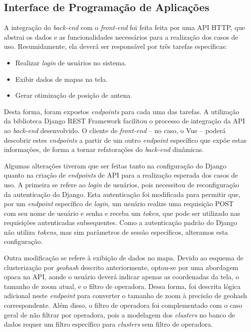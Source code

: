 \documentclass[]{politex}
\begin{document}
\subsection{Interface de Programação de Aplicações}

A integração do \textit{back-end} com o \textit{front-end} foi feita feita por uma API HTTP, que
abstrai os dados e as funcionalidades necessários para a realização dos casos de
uso. Resumidamente, ela deverá ser responsável por três tarefas específicas:

\begin{itemize}
\item Realizar \textit{login} de usuários no sistema.
\item Exibir dados de mapas na tela.
\item Gerar otimização de posição de antena.
\end{itemize}

Desta forma, foram expostos \textit{endpoints} para cada uma das tarefas. A utilização
da biblioteca Django REST Framework facilitou o processo de integração da API
ao \textit{back-end} desenvolvido. O cliente de \textit{front-end} -- no caso, o Vue -- poderá descobrir
estes \textit{endpoints} a partir de um outro \textit{endpoint} específico que expõe estas informações,
de forma a tornar refatorações do \textit{back-end} dinâmicas.

Algumas alterações tiveram que ser feitas tanto na configuração do Django quanto
na criação de \textit{endpoints} de API para a realização esperada dos casos de uso. A primeira
se refere ao \textit{login} de usuários, pois necessitou de reconfiguração da
autenticação do Django. Esta autenticação foi modificada para permitir que, por
um \textit{endpoint} específico de \textit{login}, um usuário realize uma requisição POST com seu
nome de usuário e senha e receba um \textit{token}, que pode ser utilizado nas requisições
autenticadas subsequentes. Como a autenticação padrão do Django não utiliza
\textit{tokens}, mas sim parâmetros de sessão específicos, alteramos esta configuração.

Outra modificação se refere à exibição de dados no mapa. Devido ao esquema de
clusterização por \textit{geohash} descrito anteriormente, optou-se por uma abordagem
opaca na API, aonde o usuário deverá indicar apenas as coordenadas da tela, o
tamanho de zoom atual, e o filtro de operadora. Dessa forma, foi descrita
lógica adicional neste \textit{endpoint} para converter o tamanho de zoom à precisão de
geohash correspondente. Além disso, o filtro de operadora foi complementado com
o caso geral de não filtrar por operadora, pois a modelagem dos \textit{clusters} no
banco de dados requer um filtro específico para \textit{clusters} sem filtro de
operadora.
\end{document}
